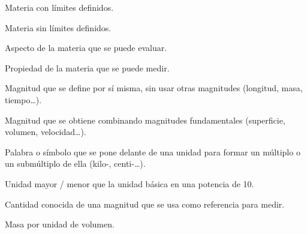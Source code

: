 \begin{vocabulary}
    Materia con límites definidos.
\end{vocabulary}

\begin{vocabulary}
    Materia sin límites definidos.
\end{vocabulary}

\begin{vocabulary}
    Aspecto de la materia que se puede evaluar.
\end{vocabulary}

\begin{vocabulary}
    Propiedad de la materia que se puede medir.
\end{vocabulary}

\begin{vocabulary}
    Magnitud que se define por sí misma, sin usar otras magnitudes (longitud, masa, tiempo\ldots).
\end{vocabulary}

\begin{vocabulary}
    Magnitud que se obtiene combinando magnitudes fundamentales (superficie, volumen, velocidad\ldots).
\end{vocabulary}

\begin{vocabulary}
    Palabra o símbolo que se pone delante de una unidad para formar un múltiplo o un submúltiplo de ella (kilo-, centi-\ldots).
\end{vocabulary}

\begin{vocabulary}
    Unidad mayor / menor que la unidad básica en una potencia de 10.
\end{vocabulary}

\begin{vocabulary}
    Cantidad conocida de una magnitud que se usa como referencia para medir.
\end{vocabulary}

\begin{vocabulary}
    Masa por unidad de volumen.
\end{vocabulary}

